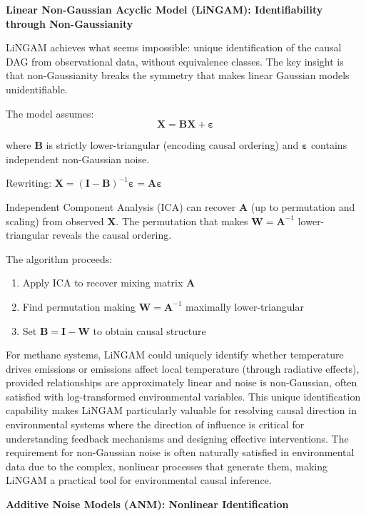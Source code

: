 \textbf{Linear Non-Gaussian Acyclic Model (LiNGAM): Identifiability through Non-Gaussianity}

LiNGAM achieves what seems impossible: unique identification of the causal DAG from observational data, without equivalence classes. The key insight is that non-Gaussianity breaks the symmetry that makes linear Gaussian models unidentifiable.

The model assumes:
\begin{equation}
	\mathbf{X} = \mathbf{B}\mathbf{X} + \boldsymbol{\varepsilon}
\end{equation}

where $\mathbf{B}$ is strictly lower-triangular (encoding causal ordering) and $\boldsymbol{\varepsilon}$ contains independent non-Gaussian noise.

Rewriting: $\mathbf{X} = (\mathbf{I} - \mathbf{B})^{-1}\boldsymbol{\varepsilon} = \mathbf{A}\boldsymbol{\varepsilon}$

Independent Component Analysis (ICA) can recover $\mathbf{A}$ (up to permutation and scaling) from observed $\mathbf{X}$. The permutation that makes $\mathbf{W} = \mathbf{A}^{-1}$ lower-triangular reveals the causal ordering.

The algorithm proceeds:
\begin{enumerate}
	\item Apply ICA to recover mixing matrix $\mathbf{A}$
	\item Find permutation making $\mathbf{W} = \mathbf{A}^{-1}$ maximally lower-triangular
	\item Set $\mathbf{B} = \mathbf{I} - \mathbf{W}$ to obtain causal structure
\end{enumerate}

For methane systems, LiNGAM could uniquely identify whether temperature drives emissions or emissions affect local temperature (through radiative effects), provided relationships are approximately linear and noise is non-Gaussian, often satisfied with log-transformed environmental variables. This unique identification capability makes LiNGAM particularly valuable for resolving causal direction in environmental systems where the direction of influence is critical for understanding feedback mechanisms and designing effective interventions. The requirement for non-Gaussian noise is often naturally satisfied in environmental data due to the complex, nonlinear processes that generate them, making LiNGAM a practical tool for environmental causal inference.

\textbf{Additive Noise Models (ANM): Nonlinear Identification}

